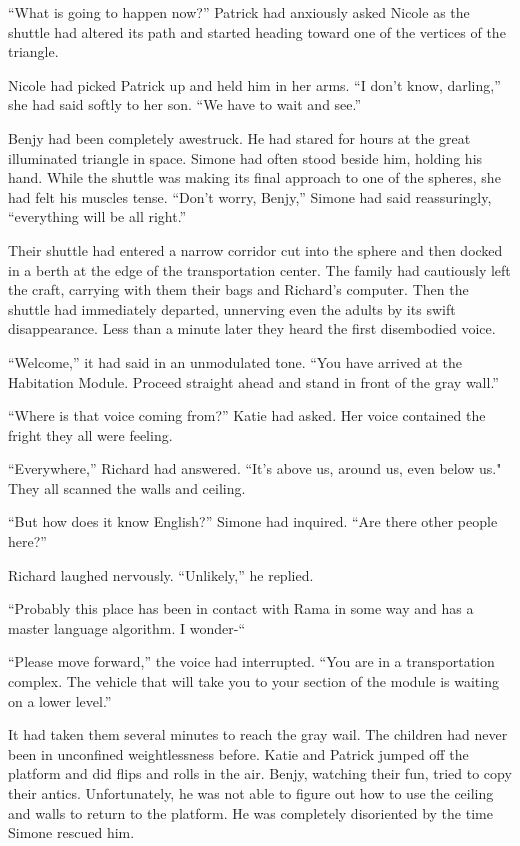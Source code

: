 \documentclass[]{article}
\begin{document}
{“What is going to happen now?” Patrick had anxiously asked Nicole as the shuttle had altered its path and started heading toward one of the vertices of the triangle.

Nicole had picked Patrick up and held him in her arms.  “I don’t know, darling,” she had said softly to her son.  “We have to wait and see.”

Benjy had been completely awestruck.  He had stared for hours at the great illuminated triangle in space.  Simone had often stood beside him, holding his hand.  While the shuttle was making its final approach to one of the spheres, she had felt his muscles tense.  “Don’t worry, Benjy,” Simone had said reassuringly, “everything will be all right.”

Their shuttle had entered a narrow corridor cut into the sphere and then docked in a berth at the edge of the transportation center.  The family had cautiously left the craft, carrying with them their bags and Richard’s computer.  Then the shuttle had immediately departed, unnerving even the adults by its swift disappearance.  Less than a minute later they heard the first disembodied voice.

“Welcome,” it had said in an unmodulated tone.  “You have arrived at the Habitation Module.  Proceed straight ahead and stand in front of the gray wall.”

“Where is that voice coming from?” Katie had asked.  Her voice contained the fright they all were feeling.

“Everywhere,” Richard had answered.  “It’s above us, around us, even below us."  They all scanned the walls and ceiling.

“But how does it know English?” Simone had inquired.  “Are there other people here?”

Richard laughed nervously.  “Unlikely,” he replied.

“Probably this place has been in contact with Rama in some way and has a master language algorithm.  I wonder-“

“Please move forward,” the voice had interrupted.  “You are in a transportation complex.  The vehicle that will take you to your section of the module is waiting on a lower level.”

It had taken them several minutes to reach the gray wail.  The children had never been in unconfined weightlessness before.  Katie and Patrick jumped off the platform and did flips and rolls in the air.  Benjy, watching their fun, tried to copy their antics.  Unfortunately, he was not able to figure out how to use the ceiling and walls to return to the platform.  He was completely disoriented by the time Simone rescued him.

}
\end{document}
